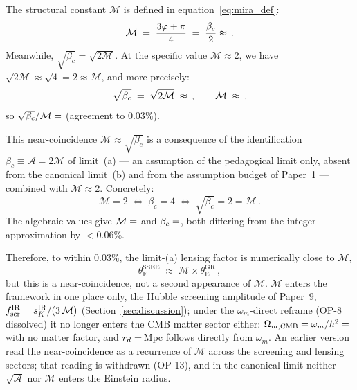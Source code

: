 \documentclass[12pt,a4paper]{article}
\newcommand{\phiG}{\varphi}
\newcommand{\MIRA}{\mathcal{M}}
\newcommand{\AURA}{\mathcal{A}}
\newcommand{\bc}{\beta_c}
\newcommand{\thetaE}{\theta_{\mathrm{E}}}
\begin{document}
The structural constant $\MIRA$ is defined in equation~\eqref{eq:mira_def}:
\begin{equation}
  \MIRA \;=\; \frac{3\phiG+\pi}{4} \;=\; \frac{\bc}{2} \approx \val{MIRA_d4}\,.
\end{equation}
Meanwhile, $\sqrt{\bc} = \sqrt{2\MIRA}$.
At the specific value $\MIRA \approx 2$, we have
$\sqrt{2\MIRA} \approx \sqrt{4} = 2 \approx \MIRA$, and
more precisely:
\begin{equation}
  \sqrt{\bc} \;=\; \sqrt{2\MIRA} \;\approx\; \val{sqrt_AURA_d4}\,,
  \qquad
  \MIRA \;\approx\; \val{MIRA_d4}\,,
  \label{eq:mira_approx}
\end{equation}
so $\sqrt{\bc}/\MIRA = \val{sqrtAURA_MIRA_d5}$ (agreement to $0.03\%$).

This near-coincidence $\MIRA \approx \sqrt{\bc}$ is a consequence of the
identification $\bc \equiv \AURA = 2\MIRA$ of limit~(a) --- an assumption of the
pedagogical limit only, absent from the canonical limit~(b) and from the
assumption budget of Paper~1 --- combined with
$\MIRA \approx 2$.
Concretely:
\begin{equation}
  \MIRA = 2 \;\Longleftrightarrow\; \bc = 4 \;\Longleftrightarrow\;
  \sqrt{\bc} = 2 = \MIRA\,.
\end{equation}
The algebraic values give $\MIRA = \val{MIRA_d4}$ and $\bc = \val{AURA_d6}$, both
differing from the integer approximation by $<0.06\%$.

Therefore, to within $0.03\%$, the limit-(a) lensing factor is numerically
close to $\MIRA$,
\begin{equation}
  \thetaE^{\mathrm{SSEE}} \;\approx\; \MIRA \times \thetaE^{\mathrm{GR}}\,,
  \label{eq:thetaE_mira}
\end{equation}
but this is a near-coincidence, not a second appearance of $\MIRA$. $\MIRA$
enters the framework in one place only, the Hubble screening amplitude of
Paper~9, $f_{\rm scr}^{\rm IR} = s_K^{\rm IR}/(3\,\MIRA)$
(Section~\ref{sec:discussion}); under the $\omega_m$-direct reframe (OP-8
dissolved) it no longer enters the CMB matter sector either:
$\Omega_{m,\mathrm{CMB}}=\omega_m/h^2=\val{OMEGA_M_TOTAL_d6}$ with no matter factor, and
$r_d=\val{p2_lyaB_rd}$\,Mpc follows directly from $\omega_m$. An earlier version read
the near-coincidence as a recurrence of $\MIRA$ across the screening and
lensing sectors; that reading is withdrawn (OP-13), and in the canonical
limit neither $\sqrt{\AURA}$ nor $\MIRA$ enters the Einstein radius.

\end{document}
